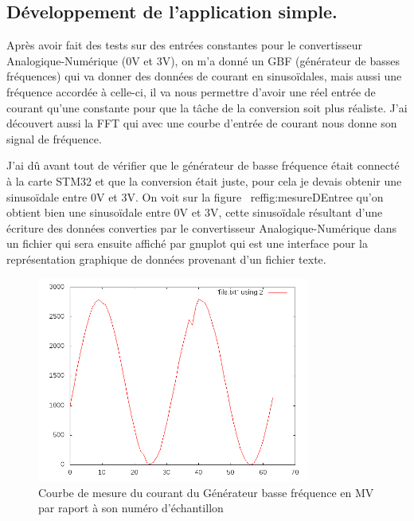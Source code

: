 \documentclass[a4paper]{article}
\begin{document}
\subsection{Développement de l'application simple. }

Après avoir fait des tests sur des entrées constantes pour le convertisseur Analogique-Numérique (0V et 3V), on m'a donné un GBF (générateur de basses fréquences) qui va donner des données de courant en sinusoïdales, mais aussi une fréquence accordée à celle-ci, il va nous permettre d'avoir une réel entrée de courant qu'une constante pour que la tâche de la conversion soit plus réaliste. J'ai découvert aussi la FFT qui avec une courbe d'entrée de courant nous donne son signal de fréquence.

J'ai dû avant tout de vérifier que le générateur de basse fréquence était connecté à la carte STM32 et que la conversion était juste, pour cela je devais obtenir une sinusoïdale entre 0V et 3V. On voit sur la figure ~ref{fig:mesureDEntree} qu'on obtient bien une sinusoïdale entre 0V et 3V, cette sinusoïdale résultant d'une écriture des données converties par le convertisseur Analogique-Numérique dans un fichier qui sera ensuite affiché par gnuplot qui est une interface pour la représentation graphique de données provenant d'un fichier texte.

\begin{figure}[H]
\centering
\includegraphics[width=0.8\textwidth]{input.png}
\caption{\label{fig:mesureDEntree}Courbe de mesure du courant du Générateur basse fréquence en MV par raport à son numéro d'échantillon}
\end{figure}
\end{document}
